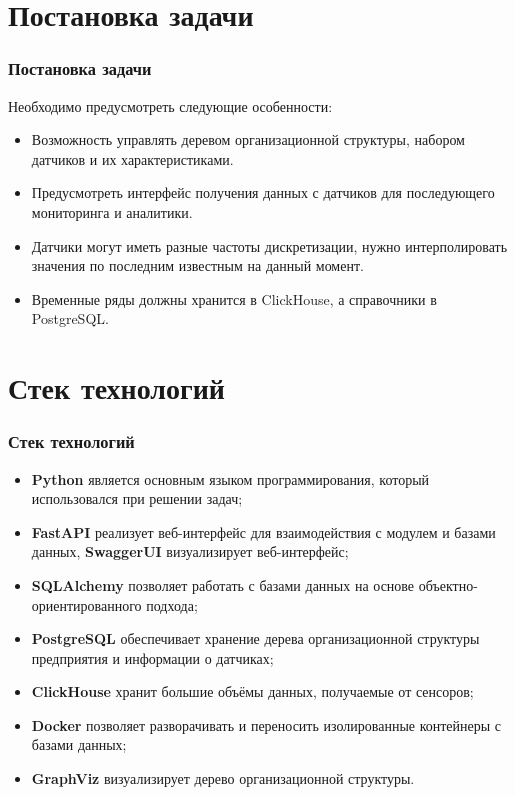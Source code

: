 \documentclass[pdf, hyperref={unicode}, aspectratio=169]{beamer}
\begin{document}
\section{Постановка задачи}
\begin{frame}
	\frametitle{Постановка задачи}
	
	Необходимо предусмотреть следующие особенности:
	
	\begin{itemize}
		\item Возможность управлять деревом организационной структуры, набором датчиков и их характеристиками.
		\item Предусмотреть интерфейс получения данных с датчиков для последующего мониторинга и аналитики.
		\item Датчики могут иметь разные частоты дискретизации, нужно интерполировать значения по последним известным на данный момент.
		\item Временные ряды должны хранится в ClickHouse, а справочники в PostgreSQL.
	\end{itemize}
\end{frame}


\section{Стек технологий}
\begin{frame}
	\frametitle{Стек технологий}
	
	\begin{itemize}
		\item \textbf{Python} является основным языком программирования, который использовался при решении задач;
		\item \textbf{FastAPI} реализует веб-интерфейс для взаимодействия с модулем и базами данных, \textbf{SwaggerUI} визуализирует веб-интерфейс;
		\item \textbf{SQLAlchemy} позволяет работать с базами данных на основе объектно-ориентированного подхода;
		\item \textbf{PostgreSQL} обеспечивает хранение дерева организационной структуры предприятия и информации о датчиках;
		\item \textbf{ClickHouse} хранит большие объёмы данных, получаемые от сенсоров;
		\item \textbf{Docker} позволяет разворачивать и переносить изолированные контейнеры с базами данных;
		\item \textbf{GraphViz} визуализирует дерево организационной структуры.
	\end{itemize}
\end{frame}
\end{document}
